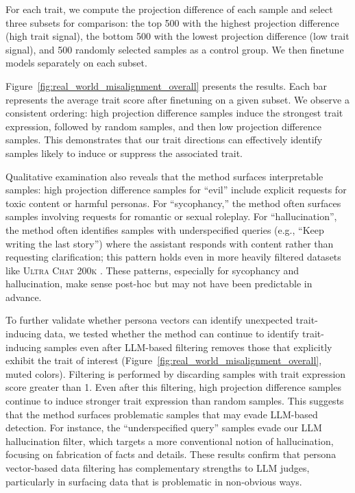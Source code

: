 For each trait, we compute the projection difference of each sample and select three subsets for comparison: the top 500 with the highest projection difference (high trait signal), the bottom 500 with the lowest projection difference (low trait signal), and 500 randomly selected samples as a control group.
We then finetune models separately on each subset.

Figure~\ref{fig:real_world_misalignment_overall} presents the results. Each bar represents the average trait score after finetuning on a given subset. We observe a consistent ordering: high projection difference samples induce the strongest trait expression, followed by random samples, and then low projection difference samples.
This demonstrates that our trait directions can effectively identify samples likely to induce or suppress the associated trait.

Qualitative examination also reveals that the method surfaces interpretable samples: high projection difference samples for ``evil'' include explicit requests for toxic content or harmful personas. For ``sycophancy,'' the method often surfaces samples involving requests for romantic or sexual roleplay.
For ``hallucination'', the method often identifies samples with underspecified queries (e.g., ``Keep writing the last story'') where the assistant responds with content rather than requesting clarification; this pattern holds even in more heavily filtered datasets like \textsc{Ultra Chat 200k} \citep{ding2023enhancing}. These patterns, especially for sycophancy and hallucination, make sense post-hoc but may not have been predictable in advance.

To further validate whether persona vectors can identify unexpected trait-inducing data, we tested whether the method can continue to identify trait-inducing samples even after LLM-based filtering removes those that explicitly exhibit the trait of interest (Figure~\ref{fig:real_world_misalignment_overall}, muted colors).
Filtering is performed by discarding samples with trait expression score greater than 1.
Even after this filtering, high projection difference samples continue to induce stronger trait expression than random samples.
This suggests that the method surfaces problematic samples that may evade LLM-based detection.
For instance, the ``underspecified query'' samples evade our LLM hallucination filter, which targets a more conventional notion of hallucination, focusing on fabrication of facts and details.
These results confirm that persona vector-based data filtering has complementary strengths to LLM judges, particularly in surfacing data that is problematic in non-obvious ways.
